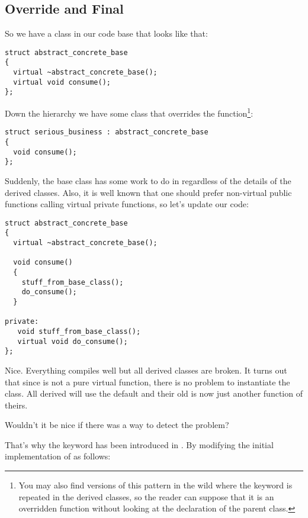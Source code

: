 \subsection{Override and Final}

So we have a class in our  code base that looks like that:

\begin{lstlisting}
struct abstract_concrete_base
{
  virtual ~abstract_concrete_base();
  virtual void consume();
};
\end{lstlisting}

Down the hierarchy we have some class that overrides the
 function\footnote{You may also find versions of this
pattern in the wild where the  keyword is repeated in
the derived classes, so the reader can suppose that it is an
overridden function without looking at the declaration of the parent
class.}:

\begin{lstlisting}
struct serious_business : abstract_concrete_base
{
  void consume();
};
\end{lstlisting}

Suddenly, the base class has some work to do in 
regardless of the details of the derived classes. Also, it is well
known that one should prefer non-virtual public functions calling
virtual private functions, so let's update our code:

\begin{lstlisting}
struct abstract_concrete_base
{
  virtual ~abstract_concrete_base();

  void consume()
  {
    stuff_from_base_class();
    do_consume();
  }

private:
   void stuff_from_base_class();
   virtual void do_consume();
};
\end{lstlisting}

Nice. Everything compiles well but all derived classes are broken. It
turns out that since  is not a pure virtual
function, there is no problem to instantiate the class. All derived
will use the default  and their old
 is now just another function of theirs.

Wouldn't it be nice if there was a way to detect the problem?

\medskip

That's why the  keyword has been introduced in
. By modifying the initial implementation of
 as follows:

